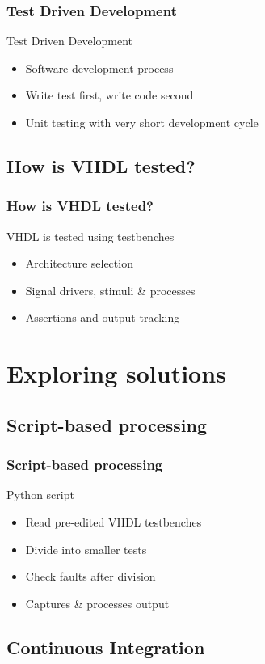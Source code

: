 \documentclass[british,10pt]{beamer}
\begin{document}
\begin{frame}\frametitle{Test Driven Development}
Test Driven Development
\begin{itemize}
\item Software development process
\item Write test first, write code second 
\item Unit testing with very short development cycle
\end{itemize}
\end{frame}

\subsection{How is VHDL tested?}

\begin{frame}\frametitle{How is VHDL tested?}
VHDL is tested using testbenches
\begin{itemize}
\item Architecture selection
\item Signal drivers, stimuli \& processes
\item Assertions and output tracking
\end{itemize}
\end{frame}

\section{Exploring solutions}
\subsection{Script-based processing}

\begin{frame}\frametitle{Script-based processing}
Python script
\begin{itemize}
\item Read pre-edited VHDL testbenches
\item Divide into smaller tests
\item Check faults after division
\item Captures \& processes output
\end{itemize}
\end{frame}


\subsection{Continuous Integration}
\end{document}
